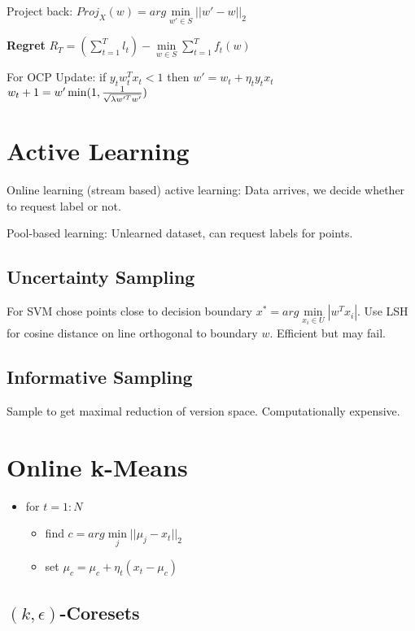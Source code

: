 \documentclass[a4paper,11pt,twocolumn]{article}
\begin{document}
Project back: $Proj_X(w) = arg \min \limits_{w' \in S} ||w' - w||_2$

\textbf{Regret} $R_T = (\sum \limits_{t=1}^T l_t) - \min \limits_{w \in S} \sum \limits_{t=1}^T f_t(w)$

For OCP Update: if $y_t w_t^T x_t < 1$ then 
$w'=w_t+\eta_t y_t x_t$
$w_t+1 = w' \min (1,{{1}\over{\sqrt{\lambda w'^T w'}}})$


\section{Active Learning}
Online learning (stream based) active learning: Data arrives, we decide whether to request label or not.

Pool-based learning: Unlearned dataset, can request labels for points.

\subsection{Uncertainty Sampling}
For SVM chose points close to decision boundary $x^* = arg \min \limits_{x_i \in U} |w^T x_i| $. Use LSH for cosine distance on line orthogonal to boundary $w$. Efficient but may fail.

\subsection{Informative Sampling}
Sample to get maximal reduction of version space. Computationally expensive.


\section{Online k-Means}
\begin{itemize}[noitemsep,topsep=0pt,parsep=0pt,partopsep=0pt]
\item for $t=1:N$
\begin{itemize}[noitemsep,topsep=0pt,parsep=0pt,partopsep=0pt]
\item find $c = arg \min \limits_j ||\mu_j - x_t ||_2$
\item set $ \mu_c = \mu_c+ \eta_t ( x_t - \mu_c)$
\end{itemize}
\end{itemize}

\subsection{$(k,\epsilon)$-Coresets}
\end{document}

